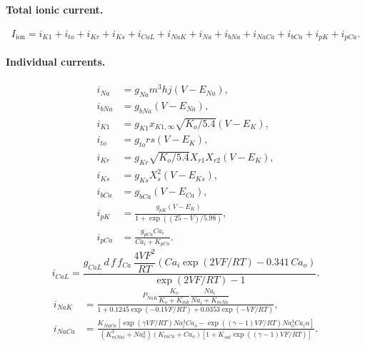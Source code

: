 \documentclass[11pt,a4paper]{article}
\begin{document}
\paragraph{Total ionic current.}
\begin{equation}
  I_{\text{ion}} =
  i_{K1}+i_{to}+i_{Kr}+i_{Ks}+i_{CaL}+i_{NaK}
  +i_{Na}+i_{bNa}+i_{NaCa}+i_{bCa}+i_{pK}+i_{pCa}.
\end{equation}

\paragraph{Individual currents.}
\begin{align}
  i_{Na} &= g_{Na}m^3hj(V-E_{Na}),\\
  i_{bNa} &= g_{bNa}(V-E_{Na}),\\
  i_{K1} &= g_{K1}x_{K1,\infty}\sqrt{K_o/5.4}(V-E_K),\\
  i_{to} &= g_{to}rs(V-E_K),\\
  i_{Kr} &= g_{Kr}\sqrt{K_o/5.4}X_{r1}X_{r2}(V-E_K),\\
  i_{Ks} &= g_{Ks}X_s^2(V-E_{Ks}),\\
  i_{bCa} &= g_{bCa}(V-E_{Ca}),\\
  i_{pK} &= \frac{g_{pK}(V-E_K)}{1+\exp((25-V)/5.98)},\\
  i_{pCa} &= \frac{g_{pCa}Ca_i}{Ca_i+K_{pCa}}.
\end{align}
\begin{equation}
  i_{CaL}
  =
  \frac{g_{CaL}\,d\,f\,f_{Ca}\,\dfrac{4VF^{2}}{RT}
       \left(Ca_i\exp(2VF/RT)-0.341\,Ca_o\right)}
       {\exp(2VF/RT)-1}.
  \label{eq:app:ical}
\end{equation}
\begin{align}
  i_{NaK} &=
  \frac{P_{NaK}\dfrac{K_o}{K_o+K_{mk}}\dfrac{Na_i}{Na_i+K_{mNa}}}
       {1+0.1245\exp(-0.1VF/RT)+0.0353\exp(-VF/RT)},\\
  i_{NaCa} &=
  \frac{K_{NaCa}\left[\exp(\gamma VF/RT)Na_i^{3}Ca_o
       -\exp((\gamma-1)VF/RT)Na_o^{3}Ca_i\alpha\right]}
       {(K_{mNai}^{3}+Na_o^{3})(K_{mCa}+Ca_o)
        \left[1+K_{sat}\exp((\gamma-1)VF/RT)\right]}.
\end{align}
\end{document}
